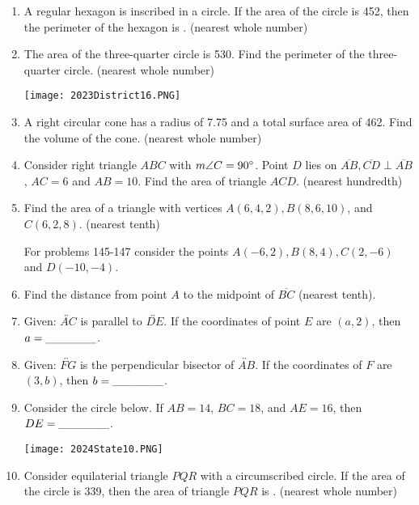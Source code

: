 \documentclass[../uilmath.tex]{subfiles}
\begin{document}
\begin{enumerate}[label=\bfseries\arabic*.]
    \item %
    A regular hexagon is inscribed in a circle. If the area of the circle is 452, then the perimeter of the hexagon is \blank. (nearest whole number)

    \item %
    The area of the three-quarter circle is 530. Find the perimeter of the three-quarter circle. (nearest whole number)
    \begin{center}
        \texttt{[image: 2023District16.PNG]}
    \end{center}

    \item %
    A right circular cone has a radius of 7.75 and a total surface area of 462. Find the volume of the cone. (nearest whole number)

    \item %
    Consider right triangle $ABC$ with $m\angle C = 90\degree$. Point $D$ lies on $\overline{AB}, \overline{CD}\perp \overline{AB}$, $AC=6$ and $AB=10$.
    Find the area of triangle $ACD$. (nearest hundredth)

    \item %
    Find the area of a triangle with vertices $A(6,4,2), B(8,6,10)$, and $C(6,2,8)$. (nearest tenth)    
    
    
    For problems 145-147 consider the points $A(-6,2), B(8,4), C(2,-6)$ and $D(-10,-4)$.
    \item %
    Find the distance from point $A$ to the midpoint of $\overline{BC}$ (nearest tenth).

    \item %
    Given: $\overleftrightarrow{AC}$ is parallel to $\overleftrightarrow{DE}$. If the coordinates of point $E$ are $(a,2)$, then $a=\_\_\_\_\_\_$.
    
    \item %
    Given: $\overleftrightarrow{FG}$ is the perpendicular bisector of $\overleftrightarrow{AB}$. If the coordinates of $F$ are $(3,b)$, then $b=\_\_\_\_\_\_$.

    \item %
    Consider the circle below. If $AB=14$, $BC=18$, and $AE=16$, then $DE=\_\_\_\_\_\_$. 
    \begin{center}
        \texttt{[image: 2024State10.PNG]}
    \end{center}

    \item %
    Consider equilaterial triangle $PQR$ with a circumscribed circle. If the area of the circle is 339, then the area of triangle $PQR$ is \blank. (nearest whole number)


\end{enumerate}
\end{document}
